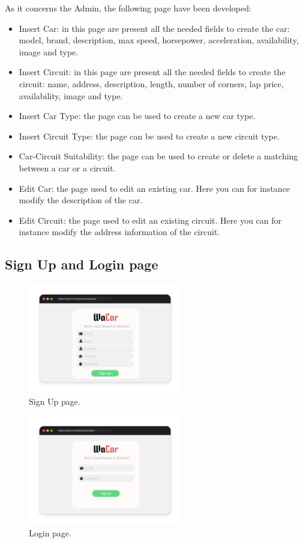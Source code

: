 As it concerns the Admin, the following page have been developed:
\begin{itemize}
    \item Insert Car: in this page are present all the needed fields to create the car: model, brand, description, max speed, horsepower, acceleration, availability, image and type.
    \item Insert Circuit: in this page are present all the needed fields to create the circuit: name, address, description, length, number of corners, lap price, availability, image and type.
    \item Insert Car Type: the page can be used to create a new car type.
    \item Insert Circuit Type: the page can be used to create a new circuit type.
    \item Car-Circuit Suitability: the page can be used to create or delete a matching between a car or a circuit.
    \item Edit Car: the page used to edit an existing car. Here you can for instance modify the description of the car.
    \item Edit Circuit: the page used to edit an existing circuit. Here you can for instance modify the address information of the circuit.
\end{itemize}

\subsection{Sign Up and Login page}

\begin{figure}[h]
  \centering
    \includegraphics[width=0.6\textwidth]{mockup/SignUp.png}
    \caption{Sign Up page.}
    \label{fig:signup}
\end{figure}

\begin{figure}[h]
    \centering
    \includegraphics[width=0.6\textwidth]{mockup/Sign in.png}
    \caption{Login page.}
    \label{fig:signin}
\end{figure}

